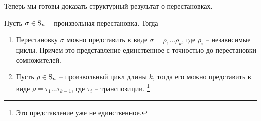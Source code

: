 Теперь мы готовы доказать структурный результат о перестановках.

\begin{claim}
\label{claim:PermutationStructure}
Пусть $\sigma\in\operatorname{S}_{n}$ -- произвольная перестановка.
Тогда
\begin{enumerate}
\item Перестановку $\sigma$ можно представить в виде $\sigma = \rho_1 \ldots \rho_k$, где $\rho_i$ -- независимые циклы.
Причем это представление единственное с точностью до перестановки сомножителей.

\item Пусть $\rho\in\operatorname{S}_{n}$ -- произвольный цикл длины $k$, тогда его можно представить в виде $\rho = \tau_1\ldots \tau_{k-1}$, где $\tau_i$ -- транспозиции.%
\footnote{Это представление уже не единственное.}
\end{enumerate}
\end{claim}
